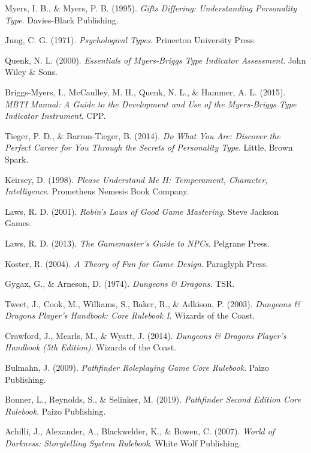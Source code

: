 Myers, I. B., \& Myers, P. B. (1995). 
\textit{Gifts Differing: Understanding Personality Type}. 
Davies-Black Publishing.

Jung, C. G. (1971). 
\textit{Psychological Types}. 
Princeton University Press.

Quenk, N. L. (2000). 
\textit{Essentials of Myers-Briggs Type Indicator Assessment}. 
John Wiley \& Sons.

Briggs-Myers, I., McCaulley, M. H., Quenk, N. L., \& Hammer, A. L. (2015). 
\textit{MBTI Manual: A Guide to the Development and Use of the Myers-Briggs Type Indicator Instrument}. 
CPP.

Tieger, P. D., \& Barron-Tieger, B. (2014). 
\textit{Do What You Are: Discover the Perfect Career for You Through the Secrets of Personality Type}. 
Little, Brown Spark.

Keirsey, D. (1998). 
\textit{Please Understand Me II: Temperament, Character, Intelligence}. 
Prometheus Nemesis Book Company.

Laws, R. D. (2001). 
\textit{Robin's Laws of Good Game Mastering}. 
Steve Jackson Games.

Laws, R. D. (2013). 
\textit{The Gamemaster's Guide to NPCs}. 
Pelgrane Press.

Koster, R. (2004). 
\textit{A Theory of Fun for Game Design}. 
Paraglyph Press.

Gygax, G., \& Arneson, D. (1974).
\textit{Dungeons \& Dragons}.
TSR.

Tweet, J., Cook, M., Williams, S., Baker, R., \& Adkison, P. (2003).
\textit{Dungeons \& Dragons Player's Handbook: Core Rulebook I}.
Wizards of the Coast.

Crawford, J., Mearls, M., \& Wyatt, J. (2014).
\textit{Dungeons \& Dragons Player's Handbook (5th Edition)}.
Wizards of the Coast.

Bulmahn, J. (2009).
\textit{Pathfinder Roleplaying Game Core Rulebook}.
Paizo Publishing.

Bonner, L., Reynolds, S., \& Selinker, M. (2019).
\textit{Pathfinder Second Edition Core Rulebook}.
Paizo Publishing.

Achilli, J., Alexander, A., Blackwelder, K., \& Bowen, C. (2007). 
\textit{World of Darkness: Storytelling System Rulebook}. 
White Wolf Publishing.

